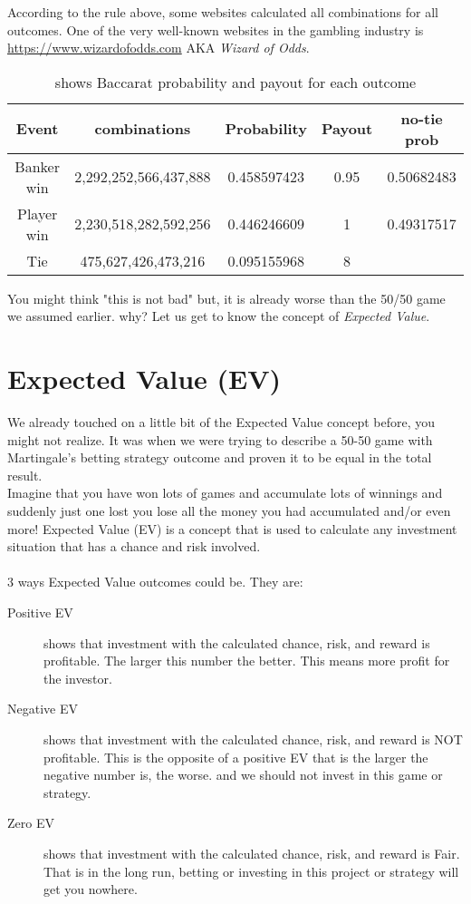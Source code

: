 \documentclass{article}
\begin{document}
According to the rule above, some websites calculated all combinations for all outcomes. One of the very well-known websites in the gambling industry is \url{https://www.wizardofodds.com} AKA \emph{Wizard of Odds}.\par

\begin{table}[htb]
\centering
\begin{tabular}{|c|c|c|c|c|}
\hline
Event & combinations & Probability & Payout & no-tie prob\\
\hline
Banker win & 2,292,252,566,437,888 & 0.458597423 & 0.95 & 0.50682483\\
Player win & 2,230,518,282,592,256 & 0.446246609 & 1 & 0.49317517\\
Tie & 475,627,426,473,216 & 0.095155968 & 8 & \\
\hline
\end{tabular}
\caption{shows Baccarat probability and payout for each outcome}
\end{table}

You might think "this is not bad" but, it is already worse than the 50/50 game we assumed earlier. why? Let us get to know the concept of \emph{Expected Value}.  

\clearpage
\section{Expected Value (EV)}

We already touched on a little bit of the Expected Value concept before, you might not realize.  It was when we were trying to describe a 50-50 game with Martingale's betting strategy outcome and proven it to be equal in the total result.\\

Imagine that you have won lots of games and accumulate lots of winnings and suddenly just one lost you lose all the money you had accumulated and/or even more!  Expected Value (EV) is a concept that is used to calculate any investment situation that has a chance and risk involved.\\
\\
3 ways Expected Value outcomes could be. They are: \par
\begin{description}
\item[Positive EV] shows that investment with the calculated chance, risk, and reward is profitable.  The larger this number the better.  This means more profit for the investor.
\item[Negative EV] shows that investment with the calculated chance, risk, and reward is NOT profitable.  This is the opposite of a positive EV that is the larger the negative number is, the worse.  and we should not invest in this game or strategy.
\item[Zero EV] shows that investment with the calculated chance, risk, and reward is Fair.  That is in the long run, betting or investing in this project or strategy will get you nowhere.  
\end{description}
\end{document}
